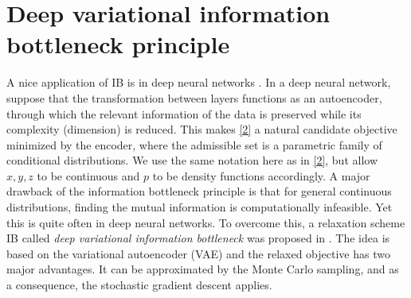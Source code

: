 \documentclass[10pt,a4paper]{amsart}
\numberwithin{equation}{section}
\theoremstyle{plain}
\theoremstyle{definition}
\begin{document}
\section{Deep variational information bottleneck principle}

A nice application of IB is in deep neural networks \cite{tishby2015deep}. In a deep neural network, suppose that the transformation between layers functions as an autoencoder, through which the relevant information of the data is preserved while its complexity (dimension) is reduced. This makes \eqref{2} a natural candidate objective minimized by the encoder, where the admissible set is a parametric family of conditional distributions. We use the same notation here as in \eqref{2}, but allow $x, y, z$ to be continuous and $p$ to be density functions accordingly. A major drawback of the information bottleneck principle is that for general continuous distributions, finding the mutual information is computationally infeasible. Yet this is quite often in deep neural networks. To overcome this, a relaxation scheme IB called \emph{deep variational information bottleneck} was proposed in \cite{alemi2016deep}. The idea is based on the variational autoencoder (VAE) \cite{kingma2013auto} and the relaxed objective has two major advantages. It can be approximated by the Monte Carlo sampling, and as a consequence, the stochastic gradient descent applies.  
\end{document}
